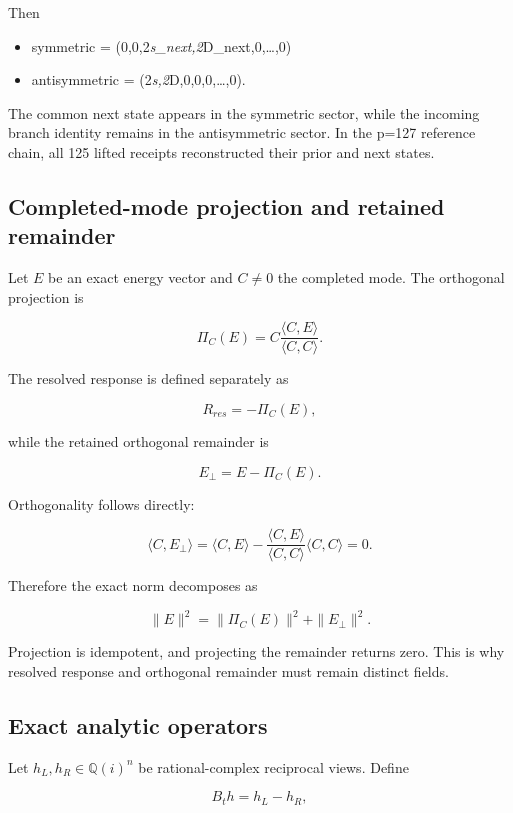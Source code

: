 Then

\begin{itemize}
\tightlist
\item
  symmetric = (0,0,2\emph{s\_next,2}D\_next,0,\ldots,0)
\item
  antisymmetric = (2\emph{s,2}D,0,0,0,\ldots,0).
\end{itemize}

The common next state appears in the symmetric sector, while the
incoming branch identity remains in the antisymmetric sector. In the
p=127 reference chain, all 125 lifted receipts reconstructed their prior
and next states.

\subsection{Completed-mode projection and retained
remainder}\label{viii-ch04-completed-mode-projection-and-retained-remainder}

Let \(E\) be an exact energy vector and \(C\ne0\) the completed mode.
The orthogonal projection is

\[
\Pi_C(E)=C\frac{\langle C,E\rangle}{\langle C,C\rangle}.
\]

The resolved response is defined separately as

\[
R_{res}=-\Pi_C(E),
\]

while the retained orthogonal remainder is

\[
E_\perp=E-\Pi_C(E).
\]

Orthogonality follows directly:

\[
\langle C,E_\perp\rangle
=\langle C,E\rangle
-\frac{\langle C,E\rangle}{\langle C,C\rangle}
 \langle C,C\rangle
=0.
\]

Therefore the exact norm decomposes as

\[
\|E\|^2=\|\Pi_C(E)\|^2+\|E_\perp\|^2.
\]

Projection is idempotent, and projecting the remainder returns zero.
This is why resolved response and orthogonal remainder must remain
distinct fields.

\subsection{Exact analytic operators}\label{viii-ch04-exact-analytic-operators}

Let \(h_L,h_R\in\mathbb Q(i)^n\) be rational-complex reciprocal views.
Define

\[
B_th=h_L-h_R,
\]

